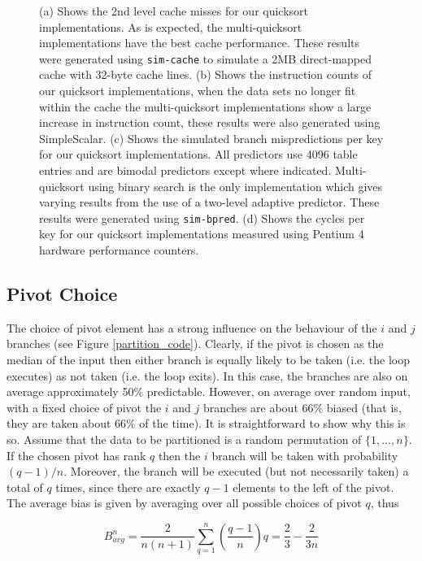 \documentclass[acmtocl]{acmtrans2m}
\begin{document}
\begin{figure}
\caption{(a) Shows the 2nd level cache misses for our quicksort implementations. As is expected, the multi-quicksort implementations have the best
cache performance. These results were generated using \texttt{sim-cache} to simulate a 2MB direct-mapped cache with 32-byte cache lines.
(b) Shows the instruction counts of our quicksort implementations, when the data sets no longer fit within the cache the multi-quicksort implementations
show a large increase in instruction count, these results were also generated using SimpleScalar. (c) Shows the simulated branch mispredictions per key
for our quicksort implementations. All predictors use 4096 table entries and are bimodal predictors except where indicated. Multi-quicksort using
binary search is the only implementation which gives varying results from the use of a two-level adaptive predictor. These results were generated
using \texttt{sim-bpred}. (d) Shows the cycles per key for our quicksort implementations measured using Pentium 4 hardware performance counters.
}
\label{quicksort_plots}
\end{figure}

\subsection{Pivot Choice}
\label{quicksort_pivot_choice}

The choice of pivot element has a strong influence on the behaviour of the $i$ and 
$j$ branches (see Figure \ref{partition_code}). Clearly, if the pivot is chosen as the median of the input then
either branch is equally likely to be taken (i.e. the loop executes) as not taken (i.e.
the loop exits). In this case, the branches are also on average approximately 50\% predictable. 
However, on average over random input, with a fixed choice of pivot the $i$ and
$j$ branches are about 66\% biased (that is, they are taken about 66\% of the time). It is
straightforward to show why this is so. Assume that the data to be partitioned is a random permutation of $\lbrace 1, \ldots, n \rbrace$.
If the chosen pivot has rank $q$ then the $i$ branch will be taken with probability $(q - 1)/n$.
Moreover, the branch will be executed (but not necessarily taken) a total of $q$ times, since there are exactly $q - 1$ elements
to the left of the pivot. The average bias is given by averaging over all 
possible choices of pivot $q$, thus

\begin{equation}
B_{avg}^n = \frac{2}{n(n + 1)}\sum_{q = 1}^n \left(\frac{q - 1}{n} \right) q = \frac{2}{3} - \frac{2}{3n} 
\label{bias_equation}\end{equation}
\end{document}
